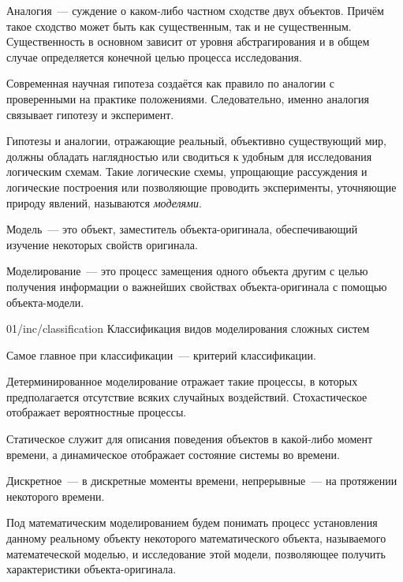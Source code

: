 \begin{dd}
    Аналогия~--- суждение о каком-либо частном сходстве двух объектов. Причём такое сходство может быть как существенным, так и не существенным. Существенность в основном зависит от уровня абстрагирования и в общем случае определяется конечной целью процесса исследования.
\end{dd}

Современная научная гипотеза создаётся как правило по аналогии с проверенными на практике положениями. Следовательно, именно аналогия связывает гипотезу и эксперимент.

Гипотезы и аналогии, отражающие реальный, объективно существующий мир, должны обладать наглядностью или сводиться к удобным для исследования логическим схемам. Такие логические схемы, упрощающие рассуждения и логические построения или позволяющие проводить эксперименты, уточняющие природу явлений, называются \textit{моделями}.

\begin{dd}
    Модель~--- это объект, заместитель объекта-оригинала, обеспечивающий изучение некоторых свойств оригинала.
\end{dd}

\begin{dd}
    Моделирование~--- это процесс замещения одного объекта другим с целью получения информации о важнейших свойствах объекта-оригинала с помощью объекта-модели.
\end{dd}

\image
{\textwidth}
{01/inc/classification}
{Классификация видов моделирования сложных систем}

Самое главное при классификации~--- критерий классификации.

Детерминированное моделирование отражает такие процессы, в которых предполагается отсутствие всяких случайных воздействий. Стохастическое отображает вероятностные процессы.

Статическое служит для описания поведения объектов в какой-либо момент времени, а динамическое отображает состояние системы во времени.

Дискретное~--- в дискретные моменты времени, непрерывные~--- на протяжении некоторого времени.

\begin{dd}
    Под математическим моделированием будем понимать процесс установления данному реальному объекту некоторого математического объекта, называемого математеческой моделью, и исследование этой модели, позволяющее получить характеристики объекта-оригинала.
\end{dd}

